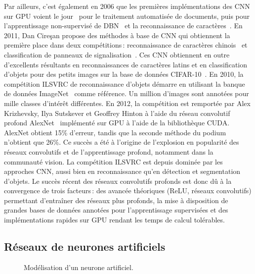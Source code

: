 Par ailleurs, c'est également en 2006 que les premières implémentations des \gls{CNN} sur \gls{GPU} voient le jour~\cite{chellapilla_high_2006} pour le traitement automatisée de documents, puis pour l'apprentissage non-supervisé de \gls{DBN}~\cite{raina_large-scale_2009} et la reconnaissance de caractères~\cite{ciresan_deep_2010}. En 2011, Dan Cire\c{s}an propose des méthodes à base de \gls{CNN} qui obtiennent la première place dans deux compétitions\,: reconnaissance de caractères chinois~\cite{liu_icdar_2011} et classification de panneaux de signalisation~\cite{stallkamp_german_2011}. Ces \gls{CNN} obtiennent en outre d'excellents résultants en reconnaissances de caractères latins et en classification d'objets pour des petits images sur la base de données CIFAR-10~\cite{ciresan_multi-column_2012}. En 2010, la compétition \gls{ILSVRC} de reconnaissance d'objets démarre en utilisant la banque de données ImageNet~\cite{deng_imagenet_2009} comme référence. Un million d'images sont annotées pour mille classes d'intérêt différentes. En 2012, la compétition est remportée par Alex Krizhevsky, Ilya Sutskever et Geoffrey Hinton à l'aide du réseau convolutif profond AlexNet~\cite{krizhevsky_imagenet_2012} implémenté sur \gls{GPU} à l'aide de la bibliothèque \gls{CUDA}. AlexNet obtient 15\% d'erreur, tandis que la seconde méthode du podium n'obtient que 26\%. Ce succès a été à l'origine de l'explosion en popularité des réseaux convolutifs et de l'apprentissage profond, notamment dans la communauté vision. La compétition \gls{ILSVRC} est depuis dominée par les approches \gls{CNN}, aussi bien en reconnaissance qu'en détection et segmentation d'objets. Le succès récent des réseaux convolutifs profonds est donc dû à la convergence de trois facteurs\,: des avancée théoriques (\gls{ReLU}, réseaux convolutifs) permettant d'entraîner des réseaux plus profonds, la mise à disposition de grandes bases de données annotées pour l'apprentissage supervisées et des implémentations rapides sur \gls{GPU} rendant les temps de calcul tolérables.

\subsection{Réseaux de neurones artificiels}

\begin{figure}[t]
  \resizebox{\textwidth}{!}{
  
  }
\caption{Modélisation d'un neurone artificiel.}
\label{fig:neurone}
\end{figure}

